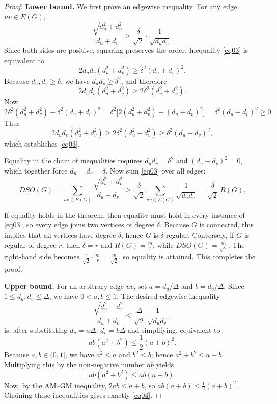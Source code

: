 \documentclass{article}
\theoremstyle{definition}
\begin{document}
\begin{proof}
\textbf{Lower bound.}
We first prove an edgewise inequality. For any edge $uv\in E(G)$,
\begin{equation}\label{eq03}
\frac{\sqrt{d_u^2+d_v^2}}{d_u+d_v} \ge \frac{\delta}{\sqrt{2}}\cdot\frac{1}{\sqrt{d_u d_v}}. 
\end{equation}
Since both sides are positive, squaring preserves the order.  Inequality \eqref{eq03} is equivalent to
\[
 2d_u d_v(d_u^2+d_v^2) \ge \delta^2(d_u+d_v)^2.
\]
Because $d_u,d_v\ge \delta$, we have $d_u d_v\ge \delta^2$, and therefore
\[
2d_u d_v(d_u^2+d_v^2) \ge 2\delta^2(d_u^2+d_v^2).
\]
Now,
\[
2\delta^2(d_u^2+d_v^2) - \delta^2(d_u+d_v)^2
= \delta^2\bigl[2(d_u^2+d_v^2) - (d_u+d_v)^2\bigr]
= \delta^2(d_u-d_v)^2 \ge 0.
\]
Thus
\[
2d_u d_v(d_u^2+d_v^2) \ge 2\delta^2(d_u^2+d_v^2) \ge \delta^2(d_u+d_v)^2,
\]
which establishes \eqref{eq03}.

Equality in the chain of inequalities requires
$d_u d_v = \delta^2$ and $(d_u-d_v)^2=0$, which together force $d_u = d_v = \delta$.
Now sum \eqref{eq03} over all edges:
\[
DSO(G) = \sum_{uv\in E(G)}\frac{\sqrt{d_u^2+d_v^2}}{d_u+d_v}
\ge \frac{\delta}{\sqrt{2}}\sum_{uv\in E(G)}\frac{1}{\sqrt{d_u d_v}}
= \frac{\delta}{\sqrt{2}}\,R(G).
\]

If equality holds in the theorem, then equality must hold in every instance of \eqref{eq03}, so every edge joins two vertices of degree $\delta$.  Because $G$ is connected, this implies that all vertices have degree $\delta$; hence $G$ is $\delta$-regular.
Conversely, if $G$ is regular of degree $r$, then $\delta = r$ and $R(G) = \frac{m}{r}$, while $DSO(G) = \frac{m}{\sqrt{2}}$.  The right‑hand side becomes $\frac{r}{\sqrt{2}}\cdot\frac{m}{r} = \frac{m}{\sqrt{2}}$, so equality is attained.  This completes the proof.

\noindent
\textbf{Upper bound.}
For an arbitrary edge $uv$, set $a = d_u/\Delta$ and $b = d_v/\Delta$.  Since $1 \le d_u,d_v \le \Delta$, we have $0 < a,b \le 1$.  The desired edgewise inequality
\[
\frac{\sqrt{d_u^2+d_v^2}}{d_u+d_v} \le \frac{\Delta}{\sqrt{2}}\,\frac{1}{\sqrt{d_u d_v}},
\]
is, after substituting $d_u = a\Delta$, $d_v = b\Delta$ and simplifying, equivalent to
\begin{equation}\label{eq04}
a b (a^2+b^2) \le \frac12 (a+b)^2. 
\end{equation}
Because $a,b \in (0,1]$, we have $a^2 \le a$ and $b^2 \le b$; hence $a^2+b^2 \le a+b$.
Multiplying this by the non‑negative number $ab$ yields
\[
ab(a^2+b^2) \le ab(a+b).
\]
Now, by the AM–GM inequality, $2ab \le a+b$, so $ab(a+b) \le \frac12 (a+b)^2$.
Chaining these inequalities gives exactly \eqref{eq04}.


\end{proof}
\end{document}
